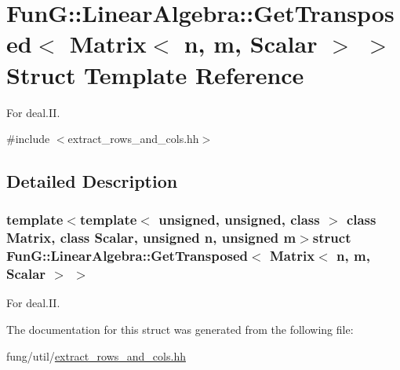 \hypertarget{structFunG_1_1LinearAlgebra_1_1GetTransposed_3_01Matrix_3_01n_00_01m_00_01Scalar_01_4_01_4}{\section{\-Fun\-G\-:\-:\-Linear\-Algebra\-:\-:\-Get\-Transposed$<$ \-Matrix$<$ n, m, \-Scalar $>$ $>$ \-Struct \-Template \-Reference}
\label{structFunG_1_1LinearAlgebra_1_1GetTransposed_3_01Matrix_3_01n_00_01m_00_01Scalar_01_4_01_4}
}


\-For deal.\-I\-I.  




{\ttfamily \#include $<$extract\-\_\-rows\-\_\-and\-\_\-cols.\-hh$>$}



\subsection{\-Detailed \-Description}
\subsubsection*{template$<$template$<$ unsigned, unsigned, class $>$ class \-Matrix, class Scalar, unsigned n, unsigned m$>$struct Fun\-G\-::\-Linear\-Algebra\-::\-Get\-Transposed$<$ Matrix$<$ n, m, Scalar $>$ $>$}

\-For deal.\-I\-I. 

\-The documentation for this struct was generated from the following file\-:\begin{DoxyCompactItemize}
\item 
fung/util/\hyperlink{extract__rows__and__cols_8hh}{extract\-\_\-rows\-\_\-and\-\_\-cols.\-hh}\end{DoxyCompactItemize}
